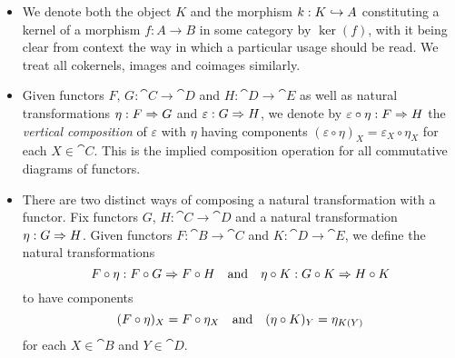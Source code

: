 \begin{itemize}
  \item
    We denote both the object $K$ and the morphism $k: K \hookrightarrow A$
    constituting a kernel of a morphism $f: A \to B$ in some category
    by $\ker(f)$, with it being clear from context the way in which a
    particular usage should be read.
    We treat all cokernels, images and coimages similarly.

  \item
    Given functors $F,\, G: \cat{C} \to \cat{D}$ and $H: \cat{D} \to
    \cat{E}$ as well as natural transformations $\eta: F \Rightarrow G$
    and $\varepsilon: G \Rightarrow H$, we denote by $\varepsilon \circ
    \eta: F \Rightarrow H$ the \emph{vertical composition} of
    $\varepsilon$ with $\eta$ having components $(\varepsilon \circ
    \eta)_X = \varepsilon_X \circ \eta_X$ for each $X \in \cat{C}$.
    This is the implied composition operation for all commutative
    diagrams of functors.

  \item
    There are two distinct ways of composing a natural transformation
    with a functor.
    Fix functors $G,\, H: \cat{C} \to \cat{D}$ and a natural
    transformation $\eta: G \Rightarrow H$.
    Given functors $F: \cat{B} \to \cat{C}$ and $K: \cat{D} \to
    \cat{E}$, we define the natural transformations
    \[
      F \circ \eta: F \circ G \Rightarrow F \circ H
      \quad \text{and} \quad
      \eta \circ K: G \circ K \Rightarrow H \circ K
    \]
    to have components
    \[
      (F \circ \eta)_X = F \circ \eta_X
      \quad \text{and} \quad
      (\eta \circ K)_Y = \eta_{K(Y)}
    \]
    for each $X \in \cat{B}$ and $Y \in \cat{D}$.
\end{itemize}
